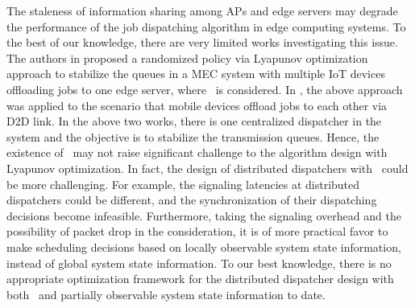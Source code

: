 The staleness of information sharing among APs and edge servers may degrade the performance of the job dispatching algorithm in edge computing systems.
To the best of our knowledge, there are very limited works investigating this issue.
The authors in \cite{JSAC17-LyuX} proposed a randomized policy via Lyapunov optimization approach to stabilize the queues in a MEC system with multiple IoT devices offloading jobs to one edge server, where \brlatency~is considered. 
In \cite{TWC18-LyuX}, the above approach was applied to the scenario that mobile devices offload jobs to each other via D2D link.
In the above two works, there is one centralized dispatcher in the system and the objective is to stabilize the transmission queues.
Hence, the existence of \brlatency~may not raise significant challenge to the algorithm design with Lyapunov optimization.
In fact, the design of distributed dispatchers with \brlatency~could be more challenging.
For example, the signaling latencies at distributed dispatchers could be different, and the synchronization of their dispatching decisions become infeasible.
Furthermore, taking the signaling overhead and the possibility of packet drop in the consideration, it is of more practical favor to make scheduling decisions based on locally observable system state information, instead of global system state information.
To our best knowledge, there is no appropriate optimization framework for the distributed dispatcher design with both \brlatency~and partially observable system state information to date.

